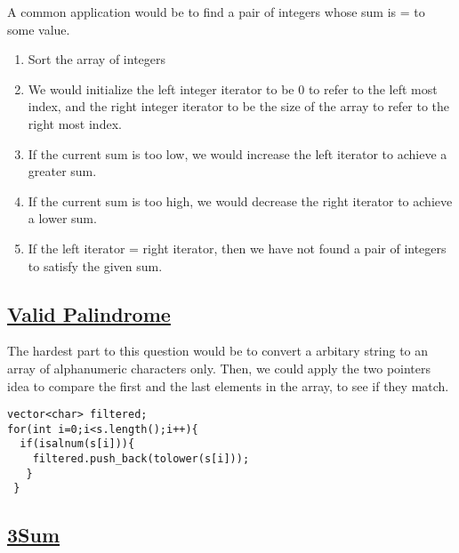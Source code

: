\documentclass[11pt]{article}
\begin{document}
A common application would be to find a pair of integers whose sum is = to some value.
\begin{enumerate}
 \item{Sort the array of integers}
 \item{
       
             We would initialize the left integer iterator to be 0 to refer to the left most index, and the right integer iterator to be the size of the array to refer to the right most index.
       }
 \item{
             If the current sum is too low, we would increase the left iterator to achieve a greater sum.
       }
 \item{
             If the current sum is too high, we would decrease the right iterator to achieve a lower sum.
       }
 \item {
       If the left iterator = right iterator, then we have not found a pair of integers to satisfy the given sum.
       }
\end{enumerate}



\subsection{
 \href{https://leetcode.com/problems/valid-palindrome/submissions/}{Valid Palindrome}
}
The hardest part to this question would be to convert a arbitary string to an array of
alphanumeric characters only. Then, we could apply the two pointers idea to compare the first and the last elements in the array, to see if they match.
\begin{lstlisting}
vector<char> filtered;
for(int i=0;i<s.length();i++){
  if(isalnum(s[i])){
    filtered.push_back(tolower(s[i]));
   }
 }
\end{lstlisting}

\subsection{
 \href{https://leetcode.com/problems/3sum/}{3Sum}
}
\end{document}
